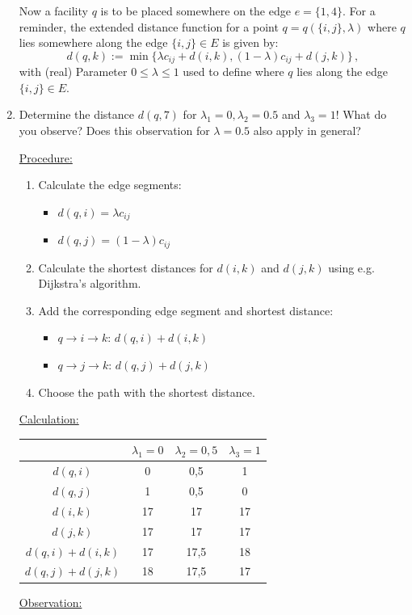 \begin{enumerate}
Now a facility $q$ is to be placed somewhere on the edge $e=\{1,4\}$. For a reminder, the extended distance function for a point $q=q(\{i,j\},\lambda)$ where $q$ lies somewhere along the edge $\{i,j\}\in E$ is given by:
	\[
	d\left(q,k\right) := \min\{\lambda c_{ij} + d\left(i,k\right), (1 - \lambda) c_{ij} + d(j,k) \} \, ,
	\]
with (real) Parameter $0 \leq \lambda \leq 1$ used to define where $q$ lies along the edge $\{i,j\}\in E$.
	\item Determine the distance $d(q,7)$ for $\lambda_1=0,\lambda_2=0.5$ and $\lambda_3=1$! What do you observe? Does this observation for $\lambda = 0.5$ also apply in general?
	\begin{solution}
	\uline{Procedure:}
		\begin{enumerate}
			\item Calculate the edge segments:
				\begin{itemize}
					\item $d\left(q,i\right)=\lambda c_{ij}$
					\item $d\left(q,j\right)=\left(1-\lambda\right)c_{ij}$
				\end{itemize}
			\item Calculate the shortest distances for $d\left(i,k\right)$ and $d\left(j,k\right)$ using e.g. Dijkstra's algorithm.
			\item Add the corresponding edge segment and shortest distance:
				\begin{itemize}
					\item $q\rightarrow i\rightarrow k$: $d\left(q,i\right)+d\left(i,k\right)$
					\item $q\rightarrow j\rightarrow k$: $d\left(q,j\right)+d\left(j,k\right)$
				\end{itemize}
			\item Choose the path with the shortest distance.
		\end{enumerate}
		\uline{Calculation:}\\
		\begin{center}
			\begin{tabular}{c|c|c|c}
			&$\lambda_1=0$&$\lambda_2=0,5$&$\lambda_3=1$\\
			\hline
			$d\left(q,i\right)$&0&0,5&1\\
			$d\left(q,j\right)$&1&0,5&0\\
			$d\left(i,k\right)$&17&17&17\\
			$d\left(j,k\right)$&17&17&17\\
			$d\left(q,i\right)+d\left(i,k\right)$&17&17,5&18\\
			$d\left(q,j\right)+d\left(j,k\right)$&18&17,5&17\\
			\end{tabular}
		\end{center}
	\uline{Observation:}\\
	

\end{solution}
\end{enumerate}
